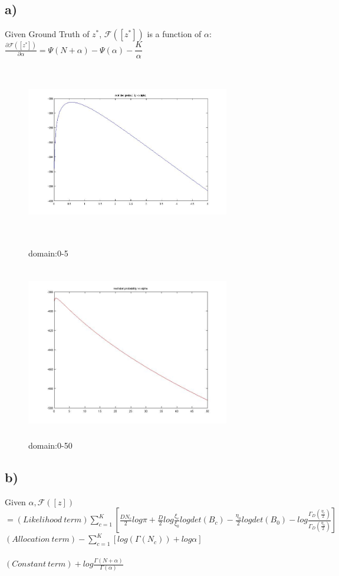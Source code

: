 \documentclass{article}
\begin{document}
\begin{spacing}{1.1}
\subsection{a)}
Given Ground Truth of $z^{*}$, $\mathcal{F}([z^{*}])$ is a function of $\alpha$:\\
$ \frac{\partial \mathcal{F}([z^{*}])}{\partial \alpha}=\Psi(N+\alpha)-\Psi(\alpha)-\dfrac{K}{\alpha}$
\begin{figure}[h] 
  \begin{minipage}[b]{0.5\textwidth} 
    \centering 
    \includegraphics[width=3.5in,height=3in]{dp_alpha.jpg} 
    \caption{domain:0-5} 
    \label{fig:by:table} 
  \end{minipage}%
  \begin{minipage}[b]{0.5\textwidth} 
    \centering 
    \includegraphics[width=3.5in,height=3in]{dd_alpha.jpg} 
    \caption{domain:0-50} 
    \label{fig:by:table}  
   \end{minipage}%
\end{figure}


\subsection{b)}
Given $\alpha,\mathcal{F}([z])$\\
$=(Likelihood\ term)\sum_{c=1}^{K}[\frac{DN_{c}}{2}log\pi+\frac{D}{2}log\frac{\xi_{c}}{\xi_{0}}log det(B_{c})
-\frac{\eta_{0}}{2}log det(B_{0})-log \frac{\Gamma_{D}(\frac{\eta_{c}}{2})}{\Gamma_{D}(\frac{\eta_{0}}{2})}]$\\
$(Allocation\ term)-\sum_{c=1}^{K}[log(\Gamma(N_{c}))+log \alpha]$\\ \\
$(Constant\ term)+log \frac{\Gamma(N+\alpha)}{\Gamma(\alpha)}$


\end{spacing}
\end{document}
